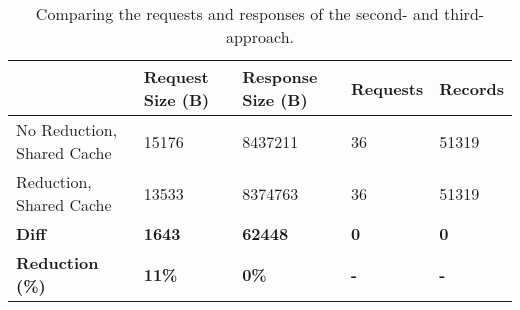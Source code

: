 \ifshowTables
\begin{table}[H]
    \begin{tabular}{|l|l|l|l|l|}
    \hline
      & Request Size (B) & Response Size (B) & Requests & Records \\
    \hline
     No Reduction, Shared Cache & 15176 &  8437211 & 36 & 51319 \\
     \hline
     Reduction, Shared Cache &  13533 &  8374763 & 36 & 51319 \\
     \hline
     \hline
     \textbf{Diff} & \textbf{1643} & \textbf{62448} & \textbf{0} & \textbf{0} \\
     \hline
     \textbf{Reduction (\%)} & \textbf{11\%} & \textbf{0\%} & \textbf{-} & \textbf{-} \\
     \hline
    \end{tabular}
    \caption{Comparing the requests and responses of the second- and third-approach.}
    \label{table:results:size-comparison-first-path-cache-no-reduction-cache-reduction}
\end{table}
\fi